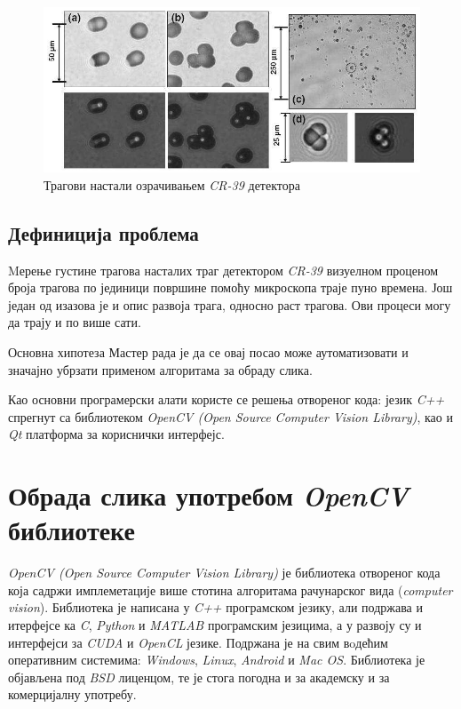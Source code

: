 \documentclass[12pt,a4paper,serbian,oneside]{book}
\begin{document}
\begin{figure}[h]
\begin{center}
\includegraphics[width=150mm]{images/dosimetry.png}
\end{center}
\caption{Трагови настали озрачивањем \textit{CR-39} детектора}
\label{fig:trag}
\end{figure}

\section{Дефиниција проблема}

Mерење густине трагова насталих траг детектором \textit{CR-39} визуелном проценом броја трагова по јединици површине помоћу микроскопа траје пуно времена. Још један од изазова је и опис развоја трага, односно раст трагова. Ови процеси могу да трају и по више сати.

Основна хипотеза Мастер рада је да се овај посао може аутоматизовати и значајно убрзати применом алгоритама за обраду слика. 

Као основни програмерски алати користе се решења отвореног кода:
језик \textit{C++} спрегнут са библиотеком \textit{OpenCV (Open Source Computer Vision Library)}, као и \textit{Qt} платформа за кориснички интерфејс.

%
%
%

\chapter{Обрада слика употребом \textit{OpenCV} библиотеке}

\textit{OpenCV (Open Source Computer Vision Library)} \cite{opencv} је библиотека отвореног кода која садржи имплеметације више стотина алгоритама рачунарског вида (\textit{computer vision}). Библиотека је написана у \textit{C++} програмском језику, али подржава и итерфејсе ка \textit{C}, \textit{Python} и \textit{MATLAB} програмским језицима, а у развоју су и интерфејси за \textit{CUDA} и \textit{OpenCL} језике. Подржана је на свим вoдећим оперативним системима: \textit{Windows}, \textit{Linux}, \textit{Android} и \textit{Mac OS}. Библиотека је објављена под \textit{BSD} лиценцом, те је стога погодна  и за академску и за комерцијалну употребу.
\end{document}
